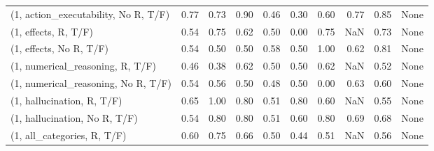 \begin{table*}[h!]
\begin{adjustbox}{width=2\columnwidth,center}
\begin{tabular}{lrrr|rrr|rrr}
(1, action\_executability, No R, T/F) &                      0.77 &                  0.73 &                      0.90 &                          0.46 &                      0.30 &                          0.60 &                                   0.77 &                               0.85 &                                  None \\
(1, effects, R, T/F)                 &                      0.54 &                  0.75 &                      0.62 &                          0.50 &                      0.00 &                          0.75 &                                    NaN &                               0.73 &                                  None \\
(1, effects, No R, T/F)              &                      0.54 &                  0.50 &                      0.50 &                          0.58 &                      0.50 &                          1.00 &                                   0.62 &                               0.81 &                                  None \\
(1, numerical\_reasoning, R, T/F)     &                      0.46 &                  0.38 &                      0.62 &                          0.50 &                      0.50 &                          0.62 &                                    NaN &                               0.52 &                                  None \\
(1, numerical\_reasoning, No R, T/F)  &                      0.54 &                  0.56 &                      0.50 &                          0.48 &                      0.50 &                          0.00 &                                   0.63 &                               0.60 &                                  None \\
(1, hallucination, R, T/F)           &                      0.65 &                  1.00 &                      0.80 &                          0.51 &                      0.80 &                          0.60 &                                    NaN &                               0.55 &                                  None \\
(1, hallucination, No R, T/F)        &                      0.54 &                  0.80 &                      0.80 &                          0.51 &                      0.60 &                          0.80 &                                   0.69 &                               0.68 &                                  None \\
(1, all\_categories, R, T/F)          &                      0.60 &                  0.75 &                      0.66 &                          0.50 &                      0.44 &                          0.51 &                                    NaN &                               0.56 &                                  None \\

\end{tabular}
\end{adjustbox}
\end{table*}
